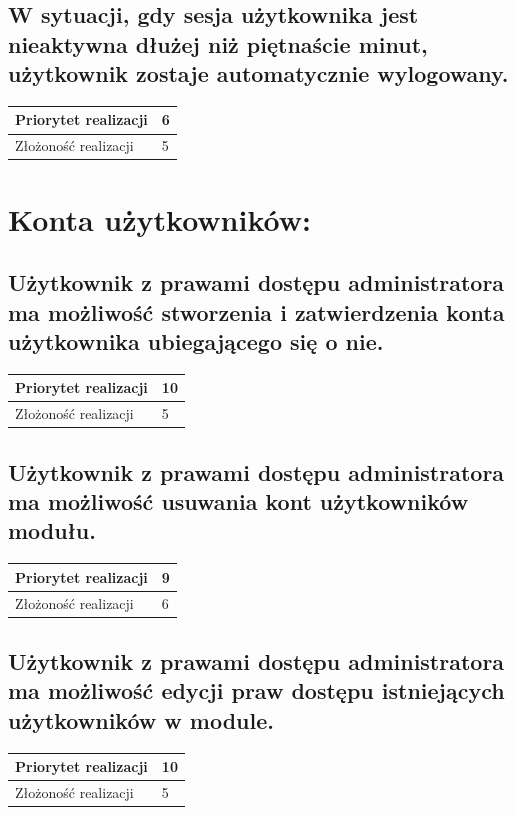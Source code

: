 \documentclass[11pt, a4paper, oneside]{report}
\begin{document}
\subsection{W sytuacji, gdy sesja użytkownika jest nieaktywna dłużej niż piętnaście minut, użytkownik zostaje automatycznie wylogowany.}
\begin{center}
\begin{tabular}[c]{| l | l | }
  \hline			
  Priorytet realizacji & 6 \\
  \hline
  Złożoność realizacji & 5 \\
  \hline  
\end{tabular}
\end{center}

\section{Konta użytkowników:}
\subsection{Użytkownik z prawami dostępu administratora ma możliwość stworzenia i zatwierdzenia konta użytkownika ubiegającego się o nie.}
\begin{center}
\begin{tabular}[c]{| l | l | }
  \hline			
  Priorytet realizacji & 10 \\
  \hline
  Złożoność realizacji & 5 \\
  \hline  
\end{tabular}
\end{center}
\subsection{Użytkownik z prawami dostępu administratora ma możliwość usuwania kont użytkowników modułu.}
\begin{center}
\begin{tabular}[c]{| l | l | }
  \hline			
  Priorytet realizacji & 9 \\
  \hline
  Złożoność realizacji & 6 \\
  \hline  
\end{tabular}
\end{center}
\subsection{Użytkownik z prawami dostępu administratora ma możliwość edycji praw dostępu istniejących użytkowników w module.}
\begin{center}
\begin{tabular}[c]{| l | l | }
  \hline			
  Priorytet realizacji & 10 \\
  \hline
  Złożoność realizacji & 5 \\
  \hline  
\end{tabular}
\end{center}
\end{document}
